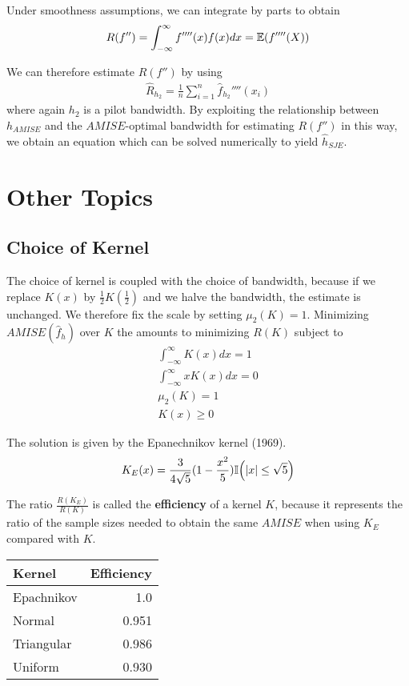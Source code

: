 Under smoothness assumptions, we can integrate by parts to obtain
\begin{align}
  \label{eq:37}
  R(f'') = \int_{-\infty}^{\infty} f''''(x) f(x) dx = \E{f''''(X)}
\end{align}

We can therefore estimate $R(f'')$ by using
\begin{align}
  \label{eq:38}
  \hat R_{h_{2}} = \frac{1}{n} \sum_{i=1}^{n} \hat
  f_{h_{2}}''''(x_{i})
\end{align} where again $h_{2}$ is a pilot bandwidth.  By exploiting
the relationship between $h_{AMISE}$ and the $AMISE$-optimal bandwidth
for estimating $R(f'')$ in this way, we obtain an equation which can
be solved numerically to yield $\hat h_{SJE}$.


\section{Other Topics}
\label{sec:other-topics}

\subsection{Choice of Kernel}
\label{sec:choice-kernel}

The choice of kernel is coupled with the choice of bandwidth, because
if we replace $K(x)$ by $\frac{1}{2} K(\frac{1}{2})$ and we halve the
bandwidth, the estimate is unchanged.  We therefore fix the scale by
setting $\mu_{2}(K) = 1$.  Minimizing $AMISE(\hat f_{h})$ over $K$ the
amounts to minimizing $R(K)$ subject to
\begin{align}
  \label{eq:40}
  \int_{-\infty}^{\infty} K(x) dx = 1 \\
  \int_{-\infty}^{\infty} x K(x) dx = 0 \\
  \mu_{2}(K) = 1 \\
  K(x) \geq 0
\end{align}

The solution is given by the Epanechnikov kernel (1969).
\begin{align}
  \label{eq:41}
  K_{E}(x) = \frac{3}{4 \sqrt{5}}(1 - \frac{x^{2}}{5}) \I{|x| \leq \sqrt{5}}
\end{align}

The ratio $\frac{R(K_{E})}{R(K)}$ is called the \textbf{efficiency} of
a kernel $K$, because it represents the ratio of the sample sizes
needed to obtain the same $AMISE$ when using $K_{E}$ compared with $K$.


\begin{tabular}{lr}
Kernel & Efficiency \\
\hline
Epachnikov & 1.0 \\
Normal & 0.951 \\
Triangular & 0.986 \\
Uniform & 0.930 \\
\end{tabular}


